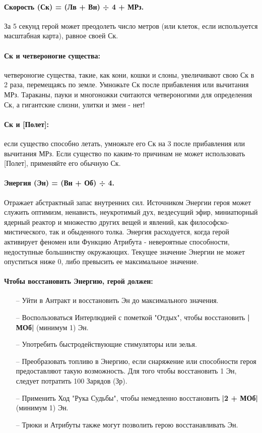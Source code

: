 \paragraph{Скорость (Ск) = (Лв + Вн) ÷ 4 + МРз.} За 5 секунд герой может преодолеть число метров (или клеток, если используется масштабная карта), равное своей Ск.
\paragraph{Ск и четвероногие существа:} четвероногие существа, такие, как кони, кошки и слоны, увеличивают свою Ск в 2 раза, перемещаясь по земле. Умножьте Ск после прибавления или вычитания МРз. Тараканы, пауки и многоножки считаются четвероногими для определения Ск, а гигантские слизни, улитки и змеи - нет!
\paragraph{Ск и [Полет]:} если существо способно летать, умножьте его Ск на 3 после прибавления или вычитания МРз. Если существо по каким-то причинам не может использовать [Полет], применяйте его обычную Ск.

\paragraph{Энергия (Эн) = (Вн + Об) ÷ 4.} Отражает абстрактный запас внутренних сил. Источником Энергии героя может служить оптимизм, ненависть, неукротимый дух, вездесущий эфир, миниатюрный ядерный реактор и множество других вещей и явлений, как философско-мистического, так и обыденного толка.
\newline Энергия расходуется, когда герой активирует феномен или Функцию Атрибута - невероятные способности, недоступные большинству окружающих. Текущее значение Энергии не может опуститься ниже 0, либо превысить ее максимальное значение.

\paragraph{Чтобы восстановить Энергию, герой должен:}
\begin{itemize}
    \item[--] Уйти в Антракт и восстановить Эн до максимального значения.
    \item[--] Воспользоваться Интерлюдией с пометкой "Отдых", чтобы восстановить \textbf{|МОб|} (минимум 1) Эн.
    \item[--] Употребить быстродействующие стимуляторы или зелья.
    \item[--] Преобразовать топливо в Энергию, если снаряжение или способности героя предоставляют такую возможность. Для того чтобы восстановить 1 Эн, следует потратить 100 Зарядов (Зр).
    \item[--] Применить Ход "Рука Судьбы", чтобы немедленно восстановить \textbf{|2 + МОб|} (минимум 1) Эн.
    \item[--] Трюки и Атрибуты также могут позволить герою восстанавливать Эн. 
\end{itemize}

